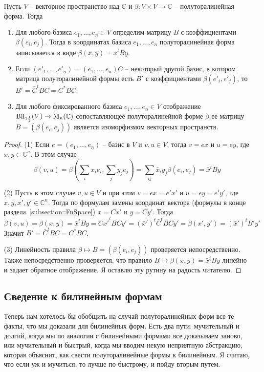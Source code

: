 \begin{claim}
Пусть $V$ -- векторное пространство над $\mathbb C$ и $\beta \colon V\times V \to \mathbb C$ -- полуторалинейная форма. Тогда
\begin{enumerate}
\item Для любого базиса $e_1,\ldots,e_n\in V$ определим матрицу $B$ с коэффициентами $\beta(e_i, e_j)$. Тогда в координатах базиса $e_1,\ldots,e_n$ полуторалинейная форма записывается в виде $\beta(x, y) = \bar x^t B y$.

\item Если $(e'_1,\ldots,e'_n) = (e_1,\ldots,e_n)C$ -- некоторый другой базис, в котором матрица полуторалинейной формы есть $B'$ с коэффициентами $\beta(e'_i,e'_j)$, то $B' = \bar C^t B C = C^* B C$.

\item Для любого фиксированного базиса $e_1,\ldots,e_n\in V$ отображение $\operatorname{Bil}_{1\frac{1}{2}}(V)\to \operatorname{M}_n(\mathbb C)$ сопоставляющее полуторалинейной форме $\beta$ ее матрицу $B = (\beta(e_i,e_j))$ является изоморфизмом векторных пространств.
\end{enumerate}
\end{claim}
\begin{proof}
(1) Если $e = (e_1,\ldots,e_n)$ -- базис в $V$ и $v,u\in V$, тогда $v = ex$ и $u = ey$, где $x,y\in \mathbb C^n$. В этом случае
\[
\beta(v,u) = \beta(\sum_i x_i e_i, \sum_j y_j e_j) = \sum_{ij}\bar x_i y_j \beta(e_i, e_j) = \bar x^t B y
\]

(2) Пусть в этом случае $v,u\in V$ и при этом $v = ex = e' x'$ и $u = ey = e'y'$, где $x,y,x',y'\in \mathbb C^n$. Тогда по формулам замены координат вектора (формулы в конце раздела~\ref{subsection::FnSpace}) $x = Cx'$ и $y = Cy'$. Тогда
\[
\beta(v,u) =\beta(x,y) = \bar x^t B y = \overline{Cx'}^t B C y' = (\bar x')^t \bar C^t B C y' = \beta(x',y') = (\bar x')^t B' y'
\]
Значит $B' = \bar C^t B C = C^* B C$.

(3) Линейность правила $\beta\mapsto B = (\beta(e_i, e_j))$ проверяется непосредственно. Также непосредственно проверяется, что правило $B\mapsto \beta(x,y) = \bar x^t B y$ линейно и задает обратное отображение. Я оставлю эту рутину на радость читателю.
\end{proof}


\subsection{Сведение к билинейным формам}
Теперь нам хотелось бы обобщить на случай полуторалинейных форм все те факты, что мы доказали для билинейных форм. Есть два пути: мучительный и долгий, когда мы по аналогии с билинейными формами все доказываем заново, или мучительный и быстрый, когда мы вводим некую неприятную абстракцию, которая объяснит, как свести полуторалинейные формы к билинейным. Я считаю, что если уж и мучиться, то лучше по-быстрому, и пойду вторым путем.

